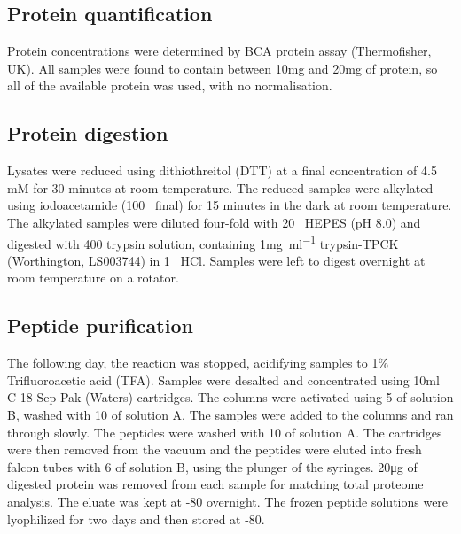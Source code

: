 \subsection{Protein quantification}
Protein concentrations were determined by BCA protein assay (Thermofisher, UK).
All samples were found to contain between 10\si{\mg} and 20\si{\mg} of protein, so all of the available protein was used, with no normalisation.

\subsection{Protein digestion}
Lysates were reduced using dithiothreitol (DTT) at a final concentration of 4.5 mM for 30 minutes at room temperature.
The reduced samples were alkylated using iodoacetamide (100\si{\milli\Molar} final) for 15 minutes in the dark at room temperature.
The alkylated samples were diluted four-fold with 20\si{\milli\Molar} HEPES (pH 8.0) and digested with 400\ul{} trypsin solution, containing 1\si{\mg\per\ml} trypsin-TPCK (Worthington, LS003744) in 1\si{\milli\Molar} HCl.
Samples were left to digest overnight at room temperature on a rotator.

\subsection{Peptide purification}
The following day, the reaction was stopped, acidifying samples to 1\% Trifluoroacetic acid (TFA)\@.
Samples were desalted and concentrated using 10ml C-18 Sep-Pak (Waters) cartridges.
The columns were activated using 5\ml{} of solution B, washed with 10\ml{} of solution A\@.
The samples were added to the columns and ran through slowly.
The peptides were washed with 10\ml{} of solution A\@.
The cartridges were then removed from the vacuum and the peptides were eluted into fresh falcon tubes with 6\ml{} of solution B, using the plunger of the syringes.
20\si{\ug} of digested protein was removed from each sample for matching total proteome analysis.
The eluate was kept at -80\C{} overnight.
The frozen peptide solutions were lyophilized for two days and then stored at -80\C{}.
%

